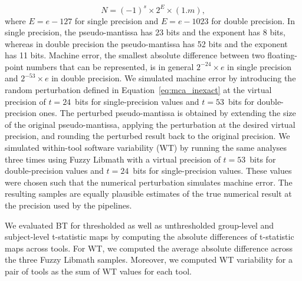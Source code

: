\documentclass[11pt,onecolumn]{article}
\begin{document}
\begin{equation}
  N = (-1)^s \times 2^E \times (1.m),
\end{equation}
where $E=e-127$ for single precision and $E=e-1023$ for double precision.
In single precision, the pseudo-mantissa has 23 bits and the exponent has 8 bits, whereas in 
double precision the pseudo-mantissa has 52 bits and the exponent has 11 bits. 
Machine error, the smallest absolute difference between two
floating-point numbers that can be represented, is in general $2^{-24}\times e$ in
single precision and $2^{-53}\times e$ in double precision.
We simulated machine error by introducing the random perturbation defined
in Equation~\ref{eq:mca_inexact} at the virtual precision of $t=24$~bits for single-precision 
values and $t=53$~bits for double-precision ones. The perturbed pseudo-mantissa
is obtained by extending the size of the original pseudo-mantissa, applying the perturbation 
at the desired virtual precision, and rounding the perturbed result
 back to the original precision.  
We simulated within-tool software variability (WT) by running the same analyses three
times using Fuzzy Libmath with a virtual precision of $t=53$~bits for
double-precision values and $t=24$~bits for single-precision values. 
These values were chosen such that the numerical perturbation simulates machine error.
The resulting samples are equally plausible estimates of
the true numerical result at the precision used by the pipelines. 

We evaluated BT for thresholded as well as unthresholded
group-level and subject-level t-statistic maps by computing the absolute
differences of t-statistic maps across tools. For WT, we computed the
average absolute difference across the three Fuzzy Libmath samples.
Moreover, we computed WT variability for a pair of tools as the sum of WT values for each tool.
\end{document}
